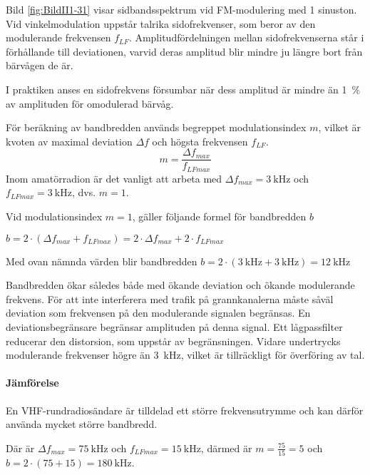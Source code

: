 
Bild \ref{fig:BildII1-31} visar sidbandsspektrum vid FM-moduler\-ing med 1
sinuston.
Vid vinkelmodulation uppstår talrika sidofrekvenser, som beror av den
modulerande frekvensen \(f_{LF}\).
Amplitudfördelningen mellan sidofrekvenserna står i förhållande till
deviationen, varvid deras amplitud blir mindre ju längre bort från bärvågen
de är.

I praktiken anses en sidofrekvens försumbar när dess amplitud är mindre än 1~\%
av amplituden för omodulerad bärvåg.

För beräkning av bandbredden används begreppet modulationsindex \(m\), vilket är
kvoten av maximal deviation \(\Delta f\) och högsta frekvensen \(f_{LF}\).
\[m = \dfrac{\Delta f_{max}}{f_{LFmax}}\]
Inom amatörradion är det vanligt att arbeta med \(\Delta f_{max} =
\SI{3}{\kilo\hertz}\) och \(f_{LFmax} = \SI{3}{\kilo\hertz}\), dvs. \(m = 1\).

Vid modulationsindex \(m = 1\), gäller följande formel för bandbredden \(b\)

\medskip
\(b = 2 \cdot ( \Delta f_{max} + f_{LFmax}) = 2 \cdot \Delta f_{max}
 + 2 \cdot f_{LFmax}\)
 \medskip
 
Med ovan nämnda värden blir bandbredden \(b = 2 \cdot (\SI{3}{\kilo\hertz} +
\SI{3}{\kilo\hertz}) = \SI{12}{\kilo\hertz}\)

Bandbredden ökar således både med ökande deviation och ökande modulerande
frekvens.
För att inte interferera med trafik på grannkanalerna måste såväl deviation som
frekvensen på den modulerande signalen begränsas.
En deviationsbegränsare begränsar amplituden på denna signal.
Ett lågpassfilter reducerar den distorsion, som uppstår av begränsningen.
Vidare undertrycks modulerande frekvenser högre än \SI{3}{\kilo\hertz}, vilket
är tillräckligt för överföring av tal.

\paragraph{Jämförelse}

En VHF-rundradiosändare är tilldelad ett större frekvensutrymme och kan därför
använda mycket större bandbredd.

Där är \(\Delta f_{max} = \SI{75}{\kilo\hertz}\) och \(f_{LFmax} =
\SI{15}{\kilo\hertz}\), därmed är \(m = \frac{75}{15} = 5\) och \(b = 2 \cdot
(75 + 15) = \SI{180}{\kilo\hertz}\).

